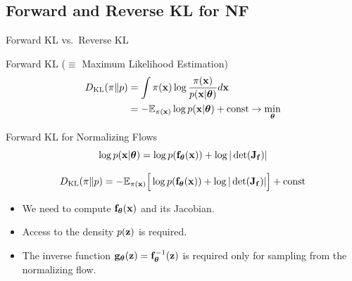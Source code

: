 \documentclass{beamer}
\begin{document}
\subsection{Forward and Reverse KL for NF}
\begin{frame}{Forward KL vs.\ Reverse KL}
	\begin{block}{Forward KL ($\equiv$ Maximum Likelihood Estimation)}
		\vspace{-0.5cm}
		\begin{align*}
			D_\mathrm{KL}(\pi \| p) &= \int \pi (\mathbf{x}) \log \frac{\pi(\mathbf{x})}{p(\mathbf{x} | \boldsymbol{\theta})} d \mathbf{x} \\
			&= - \mathbb{E}_{\pi(\mathbf{x})} \log p(\mathbf{x} | \boldsymbol{\theta}) + \text{const} \rightarrow \min_{\boldsymbol{\theta}}
		\end{align*}
	\end{block}
    
	\vspace{-0.5cm}
	\begin{block}{Forward KL for Normalizing Flows}
	    \vspace{-0.1cm}
		\[
			\log p(\mathbf{x}|\boldsymbol{\theta}) = \log p(\mathbf{f}_{\boldsymbol{\theta}}(\mathbf{x})) + \log  |\det (\mathbf{J}_{\mathbf{f}})|
		\]
		
		\[
			D_\mathrm{KL}(\pi \| p)  = - \mathbb{E}_{\pi(\mathbf{x})} \Big[\log p(\mathbf{f}_{\boldsymbol{\theta}}(\mathbf{x})) + \log  |\det (\mathbf{J}_{\mathbf{f}})|\Big] + \text{const} 
		\]
		\vspace{-0.2cm}
		
		\begin{itemize}
			\item We need to compute $\mathbf{f}_{\boldsymbol{\theta}}(\mathbf{x})$ and its Jacobian.
			\item Access to the density $p(\mathbf{z})$ is required.
			\item The inverse function $\mathbf{g}_{\boldsymbol{\theta}}(\mathbf{z}) = \mathbf{f}^{-1}_{\boldsymbol{\theta}}(\mathbf{z})$ is required only for sampling from the normalizing flow.
		\end{itemize}
	\end{block}
\end{frame}
\end{document}
